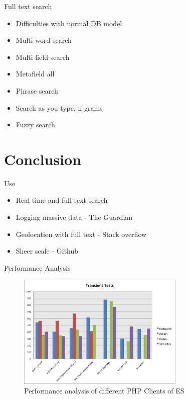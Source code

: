 \documentclass[10pt]{beamer}
\begin{document}
\begin{frame}{Full text search}
	\begin{itemize}
		\item Difficulties with normal DB model
		\item Multi word search
		\item Multi field search
		\item Metafield all
		\item Phrase search
		\item Search as you type, n-grams
		\item Fuzzy search
	\end{itemize}
\end{frame}


\section{Conclusion}
\begin{frame}{Use}
	\begin{itemize}
		\item Real time and full text search
		\item Logging massive data - The Guardian
		\item Geolocation with full text - Stack overflow
		\item Sheer scale - Github
	\end{itemize}
\end{frame}

\begin{frame}{Performance Analysis}
	\begin{figure}
		\centering\includegraphics[width=8cm]{clients}
		\caption{Performance analysis of different PHP Clients of ES}
	\end{figure}
\end{frame}
\end{document}
